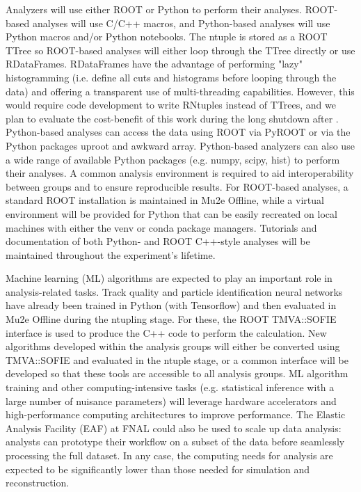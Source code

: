 Analyzers will use either ROOT or Python to perform their analyses. ROOT-based analyses will use C/C++ macros, and Python-based analyses will use Python macros and/or Python notebooks. The ntuple is stored as a ROOT TTree so ROOT-based analyses will either loop through the TTree directly or use RDataFrames. RDataFrames have the advantage of performing "lazy" histogramming (i.e. define all cuts and histograms before looping through the data) and offering a transparent use of multi-threading capabilities. However, this would require code development to write RNtuples instead of TTrees, and we plan to evaluate the cost-benefit of this work during the long shutdown after \runone. Python-based analyses can access the data using ROOT via PyROOT or via the Python packages uproot and awkward array. Python-based analyzers can also use a wide range of available Python packages (e.g. numpy, scipy, hist) to perform their analyses. A common analysis environment is required to aid interoperability between groups and to ensure reproducible results. For ROOT-based analyses, a standard ROOT installation is maintained in Mu2e Offline, while a virtual environment will be provided for Python that can be easily recreated on local machines with either the venv or conda package managers. Tutorials and documentation of both Python- and ROOT C++-style analyses will be maintained throughout the experiment's lifetime. 

Machine learning (ML) algorithms are expected to play an important role in analysis-related tasks. Track quality and particle identification neural networks have already been trained in Python (with Tensorflow) and then evaluated in Mu2e Offline during the ntupling stage. For these, the ROOT TMVA::SOFIE interface is used to produce the C++ code to perform the calculation. New algorithms developed within the analysis groups will either be converted using TMVA::SOFIE and evaluated in the ntuple stage, or a common interface will be developed so that these tools are accessible to all analysis groups. ML algorithm training and other computing-intensive tasks (e.g. statistical inference with a large number of nuisance parameters) will leverage hardware accelerators and high-performance computing architectures to improve performance. The Elastic Analysis Facility (EAF) at FNAL could also be used to scale up data analysis: analysts can prototype their workflow on a subset of the data before seamlessly processing the full dataset. In any case, the computing needs for analysis are expected to be significantly lower than those needed for simulation and reconstruction.


